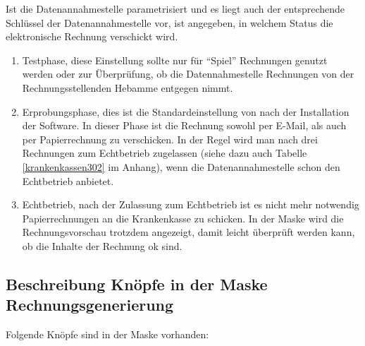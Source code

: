 Ist die Datenannahmestelle parametrisiert und es liegt auch der
entsprechende Schlüssel der Datenannahmestelle vor, ist angegeben,
in welchem Status die elektronische Rechnung verschickt wird.
\begin{enumerate}
\item
{}
Testphase, diese Einstellung sollte nur für ``Spiel'' Rechnungen genutzt
werden oder zur Überprüfung, ob die Datennahmestelle Rechnungen
von der Rechnungsstellenden Hebamme entgegen nimmt.
\item
{}
Erprobungsphase, dies ist die Standardeinstellung von \tinyHeb\/ nach der
Installation der Software. In dieser Phase ist die Rechnung sowohl per
E-Mail, als auch per Papierrechnung zu verschicken. In der Regel wird man
nach drei Rechnungen zum Echtbetrieb zugelassen (siehe dazu auch
Tabelle \vref{krankenkassen302} im Anhang), wenn die Datenannahmestelle
schon den Echtbetrieb anbietet.
\item
{}
Echtbetrieb, nach der Zulassung zum Echtbetrieb ist es nicht mehr notwendig
Papierrechnungen an die Krankenkasse zu schicken. In der Maske wird die
Rechnungsvorschau trotzdem angezeigt, damit leicht überprüft werden kann,
ob die Inhalte der Rechnung ok sind.
\end{enumerate}

\subsection{Beschreibung Knöpfe in der Maske Rechnungsgenerierung}
Folgende Knöpfe sind in der Maske vorhanden:

